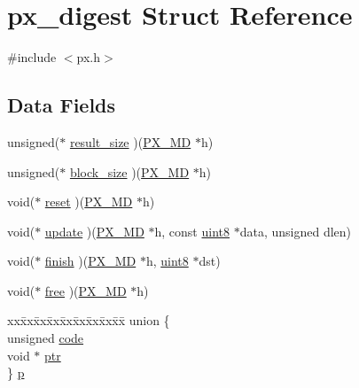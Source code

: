 \hypertarget{structpx__digest}{\section{px\-\_\-digest Struct Reference}
\label{structpx__digest}
}


{\ttfamily \#include $<$px.\-h$>$}

\subsection*{Data Fields}
\begin{DoxyCompactItemize}
\item 
unsigned($\ast$ \hyperlink{structpx__digest_a02a702a5d459e7f985658d9c217112c4}{result\-\_\-size} )(\hyperlink{px_8h_a21fa22732371ffb7737caceba5e087dd}{P\-X\-\_\-\-M\-D} $\ast$h)
\item 
unsigned($\ast$ \hyperlink{structpx__digest_a137ed005ffea79a7fda88a5f8893ce45}{block\-\_\-size} )(\hyperlink{px_8h_a21fa22732371ffb7737caceba5e087dd}{P\-X\-\_\-\-M\-D} $\ast$h)
\item 
void($\ast$ \hyperlink{structpx__digest_a72f538447abc9a94dd7d9ef52ae6327a}{reset} )(\hyperlink{px_8h_a21fa22732371ffb7737caceba5e087dd}{P\-X\-\_\-\-M\-D} $\ast$h)
\item 
void($\ast$ \hyperlink{structpx__digest_ada9f7ff6923761ddb991bf6bf0ed4ba3}{update} )(\hyperlink{px_8h_a21fa22732371ffb7737caceba5e087dd}{P\-X\-\_\-\-M\-D} $\ast$h, const \hyperlink{c_8h_adde6aaee8457bee49c2a92621fe22b79}{uint8} $\ast$data, unsigned dlen)
\item 
void($\ast$ \hyperlink{structpx__digest_ae89cdb9f137bf3be780ffc3f6614ec47}{finish} )(\hyperlink{px_8h_a21fa22732371ffb7737caceba5e087dd}{P\-X\-\_\-\-M\-D} $\ast$h, \hyperlink{c_8h_adde6aaee8457bee49c2a92621fe22b79}{uint8} $\ast$dst)
\item 
void($\ast$ \hyperlink{structpx__digest_aa2b2fff74a15b31bad4f14eacf22c107}{free} )(\hyperlink{px_8h_a21fa22732371ffb7737caceba5e087dd}{P\-X\-\_\-\-M\-D} $\ast$h)
\item 
\begin{tabbing}
xx\=xx\=xx\=xx\=xx\=xx\=xx\=xx\=xx\=\kill
union \{\\
\>unsigned \hyperlink{structpx__digest_a7760b436ae0edceac7daaa3ca7ee90dd}{code}\\
\>void $\ast$ \hyperlink{structpx__digest_acd8a79cac2b6b57525e8feb4c492db11}{ptr}\\
\} \hyperlink{structpx__digest_a12dcd37566f38c4df0f8b2dafd26f6f7}{p}\\

\end{tabbing}\end{DoxyCompactItemize}


